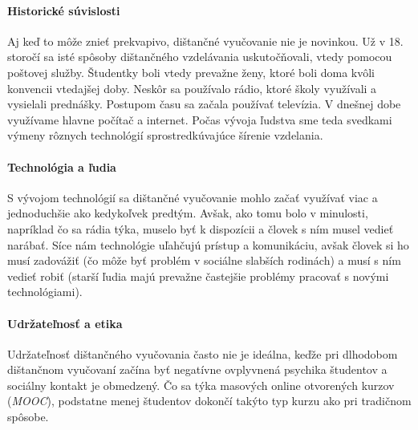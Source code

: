 \documentclass[10pt,twoside,slovak,a4paper]{article}
\begin{document}
\paragraph{Historické súvislosti}
Aj keď to môže znieť prekvapivo, dištančné vyučovanie nie je novinkou. Už v 18. storočí sa isté spôsoby dištančného vzdelávania uskutočňovali, vtedy pomocou poštovej služby. Študentky boli vtedy prevažne ženy, ktoré boli doma kvôli konvencii vtedajšej doby. Neskôr sa používalo rádio, ktoré školy využívali a vysielali prednášky. Postupom času sa začala používať televízia. V dnešnej dobe využívame hlavne počítač a internet. Počas vývoja ľudstva sme teda svedkami výmeny rôznych technológií sprostredkúvajúce šírenie vzdelania\cite{Harting:History}.

\paragraph{Technológia a ľudia}
S vývojom technológií sa dištančné vyučovanie mohlo začať využívať viac a jednoduchšie ako kedykoľvek predtým. Avšak, ako tomu bolo v minulosti, napríklad čo sa rádia týka, muselo byť k dispozícii a človek s ním musel vedieť narábať. Síce nám technológie uľahčujú prístup a komunikáciu, avšak človek si ho musí zadovážiť (čo môže byť problém v sociálne slabších rodinách) a musí s ním vedieť robiť (starší ľudia majú prevažne častejšie problémy pracovať s novými technológiami).

\paragraph{Udržateľnosť a etika}
Udržateľnosť dištančného vyučovania často nie je ideálna, keďže pri dlhodobom dištančnom vyučovaní začína byť negatívne ovplyvnená psychika študentov a sociálny kontakt je obmedzený. Čo sa týka masových online otvorených kurzov (\textit{MOOC}), podstatne menej študentov dokončí takýto typ kurzu ako pri tradičnom spôsobe\cite{Pursel:MOOC}.



\end{document}
